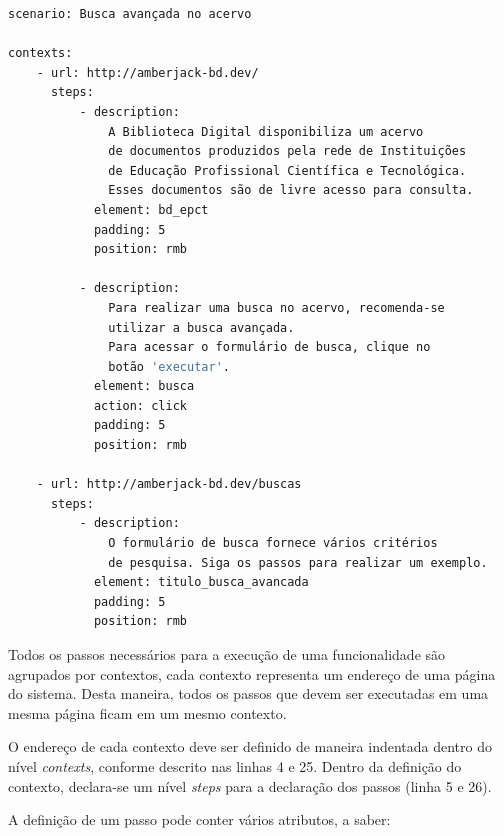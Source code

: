 {\singlespace
\begin{lstlisting}[caption=Cenário descrito em YAML,language=Bash,label={lst:codigo_cenario_yaml}]
scenario: Busca avançada no acervo

contexts:
    - url: http://amberjack-bd.dev/
      steps:
          - description:
              A Biblioteca Digital disponibiliza um acervo
              de documentos produzidos pela rede de Instituições
              de Educação Profissional Científica e Tecnológica.
              Esses documentos são de livre acesso para consulta.
            element: bd_epct
            padding: 5
            position: rmb

          - description:
              Para realizar uma busca no acervo, recomenda-se
              utilizar a busca avançada.
              Para acessar o formulário de busca, clique no
              botão 'executar'.
            element: busca
            action: click
            padding: 5
            position: rmb

    - url: http://amberjack-bd.dev/buscas
      steps:
          - description:
              O formulário de busca fornece vários critérios
              de pesquisa. Siga os passos para realizar um exemplo.
            element: titulo_busca_avancada
            padding: 5
            position: rmb
\end{lstlisting}
}

Todos os passos necessários para a execução de uma funcionalidade são agrupados por contextos, cada contexto representa um endereço de uma página do sistema. Desta maneira, todos os passos que devem ser executadas em uma mesma página ficam em um mesmo contexto.

O endereço de cada contexto deve ser definido de maneira indentada dentro do nível \textit{contexts}, conforme descrito nas linhas 4 e 25. Dentro da definição do contexto, declara-se um nível \textit{steps} para a declaração dos passos (linha 5 e 26).

A definição de um passo pode conter vários atributos, a saber:

